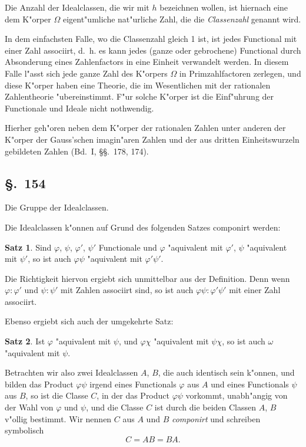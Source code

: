 \documentclass[12pt,a4paper]{article}
\theoremstyle{definition}
\newtheorem*{satz}{Satz}
\begin{document}
Die Anzahl der Idealclassen, die wir mit $h$ bezeichnen wollen, ist hiernach eine dem K"orper $\Omega$ eigent"umliche nat"urliche Zahl, die die \emph{Classenzahl} genannt wird.

In dem einfachsten Falle, wo die Classenzahl gleich 1 ist, ist jedes Functional mit einer Zahl associirt, d.~h. es kann jedes (ganze oder gebrochene) Functional durch Absonderung eines Zahlenfactors in eine Einheit verwandelt werden. In diesem Falle l"asst sich jede ganze Zahl des K"orpers $\Omega$ in Primzahlfactoren zerlegen, und diese K"orper haben eine Theorie, die im Wesentlichen mit der rationalen Zahlentheorie "ubereinstimmt. F"ur solche K"orper ist die Einf"uhrung der Functionale und Ideale nicht nothwendig.

Hierher geh"oren neben dem K"orper der rationalen Zahlen unter anderen der K"orper der Gauss'schen imagin"aren Zahlen und der aus dritten Einheitswurzeln gebildeten Zahlen (Bd.~I, \S\S.~178, 174).


\subsection*{\S.~154}

Die Gruppe der Idealclassen.

Die Idealclassen k"onnen auf Grund des folgenden Satzes componirt werden:

\begin{satz}
Sind $\varphi$, $\psi$, $\varphi'$, $\psi'$ Functionale und $\varphi$ "aquivalent mit $\varphi'$, $\psi$ "aquivalent mit $\psi'$, so ist auch $\varphi\psi$ "aquivalent mit $\varphi'\psi'$.
\end{satz}

Die Richtigkeit hiervon ergiebt sich unmittelbar aus der Definition. Denn wenn $\varphi : \varphi'$ und $\psi : \psi'$ mit Zahlen associirt sind, so ist auch $\varphi\psi : \varphi'\psi'$ mit einer Zahl associirt.

Ebenso ergiebt sich auch der umgekehrte Satz:

\begin{satz}
Ist $\varphi$ "aquivalent mit $\psi$, und $\varphi\chi$ "aquivalent mit $\psi\chi$, so ist auch $\omega$ "aquivalent mit $\psi$.
\end{satz}

Betrachten wir also zwei Idealclassen $A$, $B$, die auch identisch sein k"onnen, und bilden das Product $\varphi\psi$ irgend eines Functionals $\varphi$ aus $A$ und eines Functionals $\psi$ aus $B$, so ist die Classe $C$, in der das Product $\varphi\psi$ vorkommt, unabh"angig von der Wahl von $\varphi$ und $\psi$, und die Classe $C$ ist durch die beiden Classen $A$, $B$ v"ollig bestimmt. Wir nennen $C$ aus $A$ und $B$ \emph{componirt} und schreiben symbolisch
\begin{equation}
C = AB = BA.
\end{equation}
\end{document}

